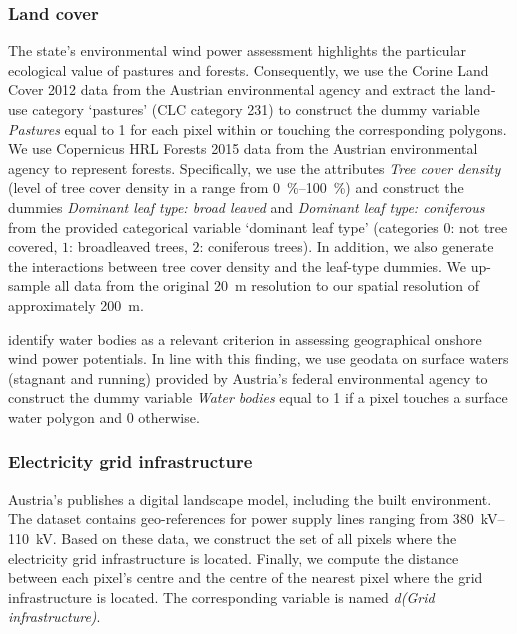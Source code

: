 \documentclass[review, a4paper, 12pt, authoryear, times]{elsarticle}
\begin{document}
\subsubsection{Land cover}
The state's environmental wind power assessment \citep{Knoll2014} highlights the particular ecological value of pastures and forests.
Consequently, we use the Corine Land Cover 2012 data from the Austrian environmental agency \citep{UBA2018b} and extract the land-use category `pastures' (CLC category 231) to construct the dummy variable \emph{Pastures} equal to 1 for each pixel within or touching the corresponding polygons.
We use Copernicus HRL Forests 2015 data from the Austrian environmental agency \citep{UBA2018a} to represent forests.
Specifically, we use the attributes \emph{Tree cover density} (level of tree cover density in a range from \SIrange{0}{100}{\percent}) and construct the dummies \emph{Dominant leaf type: broad leaved} and \emph{Dominant leaf type: coniferous} from the provided categorical variable `dominant leaf type' (categories $0$: not tree covered, $1$: broadleaved trees, $2$: coniferous trees).
In addition, we also generate the interactions between tree cover density and the leaf-type dummies.
We up-sample all data from the original \SI{20}{\metre} resolution to our spatial resolution of approximately \SI{200}{\metre}.

\cite{McKenna2022} identify water bodies as a relevant criterion in assessing geographical onshore wind power potentials. 
In line with this finding, we use geodata on surface waters (stagnant and running) provided by Austria's federal environmental agency \citep{UBA2022b, UBA2022a} to construct the dummy variable \emph{Water bodies} equal to 1 if a pixel touches a surface water polygon and 0 otherwise.

\subsubsection{Electricity grid infrastructure}
Austria's \cite{BEV2023a} publishes a digital landscape model, including the built environment.
The dataset contains geo-references for power supply lines ranging from \SIrange[]{380}{110}{\kilo\volt}.
Based on these data, we construct the set of all pixels where the electricity grid infrastructure is located. 
Finally, we compute the distance between each pixel's centre and the centre of the nearest pixel where the grid infrastructure is located. 
The corresponding variable is named \emph{d(Grid infrastructure)}.
\end{document}
